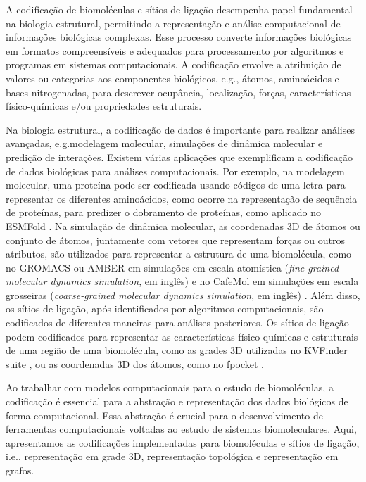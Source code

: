 \documentclass[Portugues]{phdquali}
\def\ie{i.e.\onedot}
\def\eg{e.g.\onedot}
\begin{document}
A codificação de biomoléculas e sítios de ligação desempenha papel fundamental na biologia estrutural, permitindo a representação e análise computacional de informações biológicas complexas. Esse processo converte informações biológicas em formatos compreensíveis e adequados para processamento por algoritmos e programas em sistemas computacionais. A codificação envolve a atribuição de valores ou categorias aos componentes biológicos, \eg, átomos, aminoácidos e bases nitrogenadas, para descrever ocupância, localização, forças, características físico-químicas e/ou propriedades estruturais. 

Na biologia estrutural, a codificação de dados é importante para realizar análises avançadas, \eg modelagem molecular, simulações de dinâmica molecular e predição de interações. Existem várias aplicações que exemplificam a codificação de dados biológicas para análises computacionais. Por exemplo, na modelagem molecular, uma proteína pode ser codificada usando códigos de uma letra para representar os diferentes aminoácidos, como ocorre na representação de sequência de proteínas, para predizer o dobramento de proteínas, como aplicado no ESMFold \cite{lin2022}. Na simulação de dinâmica molecular, as coordenadas 3D de átomos ou conjunto de átomos, juntamente com vetores que representam forças ou outros atributos, são utilizados para representar a estrutura de uma biomolécula, como no GROMACS \cite{gromacs} ou AMBER \cite{amber} em simulações em escala atomística (\textit{fine-grained molecular dynamics simulation}, em inglês) e no CafeMol em simulações em escala grosseiras (\textit{coarse-grained molecular dynamics simulation}, em inglês) \cite{kenzaki2011}. Além disso, os sítios de ligação, após identificados por algoritmos computacionais, são codificados de diferentes maneiras para análises posteriores. Os sítios de ligação podem codificados para representar as características físico-químicas e estruturais de uma região de uma biomolécula, como as grades 3D utilizadas no KVFinder suite \cite{oliveira2014,guerra2020,guerra2021,guerra2023B}, ou as coordenadas 3D dos átomos, como no fpocket \cite{fpocket}.

Ao trabalhar com modelos computacionais para o estudo de biomoléculas, a codificação é essencial para a abstração e representação dos dados biológicos de forma computacional. Essa abstração é crucial para o desenvolvimento de ferramentas computacionais voltadas ao estudo de sistemas biomoleculares. Aqui, apresentamos as codificações implementadas para biomoléculas e sítios de ligação, \ie, representação em grade 3D, representação topológica e representação em grafos.
\end{document}
